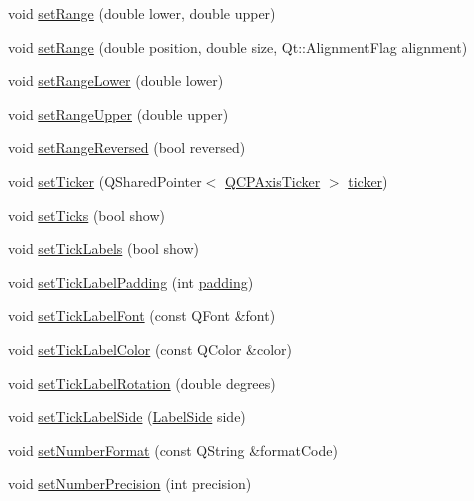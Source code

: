 \begin{DoxyCompactItemize}
void \hyperlink{class_q_c_p_axis_a57d6ee9e9009fe88cb19db476ec70bca}{set\+Range} (double lower, double upper)
\item 
void \hyperlink{class_q_c_p_axis_acf60e5b2d631fbc8c4548c3d579cb6d0}{set\+Range} (double position, double size, Qt\+::\+Alignment\+Flag alignment)
\item 
void \hyperlink{class_q_c_p_axis_afcf51227d337db28d1a9ce9a4d1bc91a}{set\+Range\+Lower} (double lower)
\item 
void \hyperlink{class_q_c_p_axis_acd3ca1247aa867b540cd5ec30ccd3bef}{set\+Range\+Upper} (double upper)
\item 
void \hyperlink{class_q_c_p_axis_a2172fdb196b1a0dc3f40992fcad8e9e1}{set\+Range\+Reversed} (bool reversed)
\item 
void \hyperlink{class_q_c_p_axis_a4ee03fcd2c74d05cd1a419b9af5cfbdc}{set\+Ticker} (Q\+Shared\+Pointer$<$ \hyperlink{class_q_c_p_axis_ticker}{Q\+C\+P\+Axis\+Ticker} $>$ \hyperlink{class_q_c_p_axis_a7b7a27151be8235059e1294f73ecf615}{ticker})
\item 
void \hyperlink{class_q_c_p_axis_ac891409315bc379e3b1abdb162c1a011}{set\+Ticks} (bool show)
\item 
void \hyperlink{class_q_c_p_axis_a04ba16e1f6f78d70f938519576ed32c8}{set\+Tick\+Labels} (bool show)
\item 
void \hyperlink{class_q_c_p_axis_af302c479af9dbc2e9f0e44e07c0012ee}{set\+Tick\+Label\+Padding} (int \hyperlink{class_q_c_p_axis_a07df379d5c017b8f3a4702532eb037b2}{padding})
\item 
void \hyperlink{class_q_c_p_axis_a2b8690c4e8dbc39d9185d2b398ce7a6c}{set\+Tick\+Label\+Font} (const Q\+Font \&font)
\item 
void \hyperlink{class_q_c_p_axis_a395e445c3fe496b935bee7b911ecfd1c}{set\+Tick\+Label\+Color} (const Q\+Color \&color)
\item 
void \hyperlink{class_q_c_p_axis_a1bddd4413df8a576b7ad4b067fb33375}{set\+Tick\+Label\+Rotation} (double degrees)
\item 
void \hyperlink{class_q_c_p_axis_a13ec644fc6e22715744c92c6dfa4f0fa}{set\+Tick\+Label\+Side} (\hyperlink{class_q_c_p_axis_a24b13374b9b8f75f47eed2ea78c37db9}{Label\+Side} side)
\item 
void \hyperlink{class_q_c_p_axis_ae585a54dc2aac662e90a2ca82f002590}{set\+Number\+Format} (const Q\+String \&format\+Code)
\item 
void \hyperlink{class_q_c_p_axis_a21dc8023ad7500382ad9574b48137e63}{set\+Number\+Precision} (int precision)
\item 

\end{DoxyCompactItemize}
